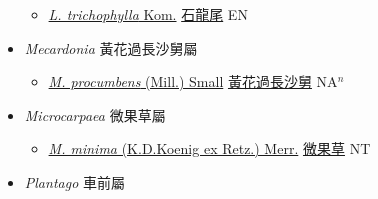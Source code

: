 \begin{itemize}
\begin{itemize}
        \item[] \href{http://www.theplantlist.org/tpl1.1/search?q=Limnophila+trichophylla}{\textit{L. trichophylla} Kom.}   \href{\detokenize{http://taibnet.sinica.edu.tw/chi/taibnet_species_list.php?T2=石龍尾&T2_new_value=true&fr=y}}{石龍尾} EN
  \end{itemize}
 \item[] \textit{Mecardonia} 黃花過長沙舅屬
                    
  \begin{itemize}
        \item[] \href{http://www.theplantlist.org/tpl1.1/search?q=Mecardonia+procumbens}{\textit{M. procumbens} (Mill.) Small}   \href{\detokenize{http://taibnet.sinica.edu.tw/chi/taibnet_species_list.php?T2=黃花過長沙舅&T2_new_value=true&fr=y}}{黃花過長沙舅} NA$^n$
  \end{itemize}
 \item[] \textit{Microcarpaea} 微果草屬
                    
  \begin{itemize}
        \item[] \href{http://www.theplantlist.org/tpl1.1/search?q=Microcarpaea+minima}{\textit{M. minima} (K.D.Koenig ex Retz.) Merr.}   \href{\detokenize{http://taibnet.sinica.edu.tw/chi/taibnet_species_list.php?T2=微果草&T2_new_value=true&fr=y}}{微果草} NT
  \end{itemize}
 \item[] \textit{Plantago} 車前屬
                    

\end{itemize}
